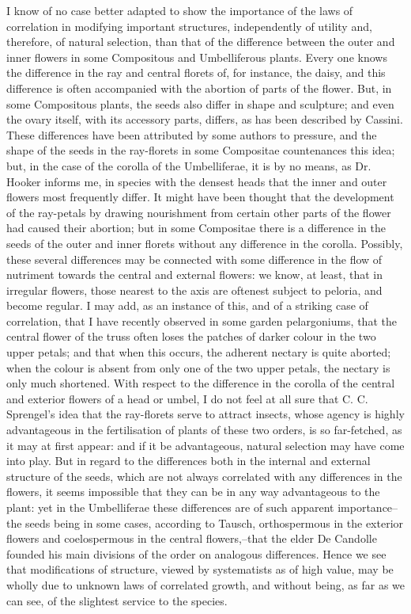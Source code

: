 I know of no case better adapted to show the importance of the laws of correlation in modifying important structures, independently of utility and, therefore, of natural selection, than that of the difference between the outer and inner flowers in some Compositous and Umbelliferous plants. Every one knows the difference in the ray and central florets of, for instance, the daisy, and this difference is often accompanied with the abortion of parts of the flower. But, in some Compositous plants, the seeds also differ in shape and sculpture; and even the ovary itself, with its accessory parts, differs, as has been described by Cassini. These differences have been attributed by some authors to pressure, and the shape of the seeds in the ray-florets in some Compositae countenances this idea; but, in the case of the corolla of the Umbelliferae, it is by no means, as Dr. Hooker informs me, in species with the densest heads that the inner and outer flowers most frequently differ. It might have been thought that the development of the ray-petals by drawing nourishment from certain other parts of the flower had caused their abortion; but in some Compositae there is a difference in the seeds of the outer and inner florets without any difference in the corolla. Possibly, these several differences may be connected with some difference in the flow of nutriment towards the central and external flowers: we know, at least, that in irregular flowers, those nearest to the axis are oftenest subject to peloria, and become regular. I may add, as an instance of this, and of a striking case of correlation, that I have recently observed in some garden pelargoniums, that the central flower of the truss often loses the patches of darker colour in the two upper petals; and that when this occurs, the adherent nectary is quite aborted; when the colour is absent from only one of the two upper petals, the nectary is only much shortened.
With respect to the difference in the corolla of the central and exterior flowers of a head or umbel, I do not feel at all sure that C. C. Sprengel's idea that the ray-florets serve to attract insects, whose agency is highly advantageous in the fertilisation of plants of these two orders, is so far-fetched, as it may at first appear: and if it be advantageous, natural selection may have come into play. But in regard to the differences both in the internal and external structure of the seeds, which are not always correlated with any differences in the flowers, it seems impossible that they can be in any way advantageous to the plant: yet in the Umbelliferae these differences are of such apparent importance--the seeds being in some cases, according to Tausch, orthospermous in the exterior flowers and coelospermous in the central flowers,--that the elder De Candolle founded his main divisions of the order on analogous differences. Hence we see that modifications of structure, viewed by systematists as of high value, may be wholly due to unknown laws of correlated growth, and without being, as far as we can see, of the slightest service to the species.
